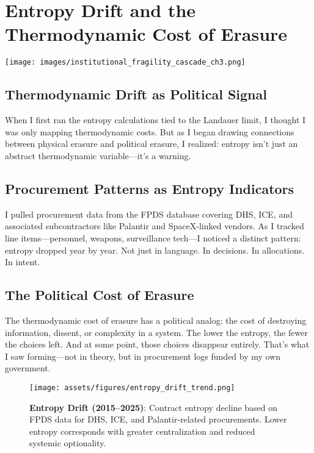 \chapter{Entropy Drift and the Thermodynamic Cost of Erasure}
\label{chap:entropy_drift}
\texttt{[image: images/institutional\_fragility\_cascade\_ch3.png]}

\section{Thermodynamic Drift as Political Signal}
\label{sec:thermo_drift_signal}

When I first ran the entropy calculations tied to the Landauer limit, I thought I was only mapping thermodynamic costs. But as I began drawing connections between physical erasure and political erasure, I realized: entropy isn't just an abstract thermodynamic variable—it’s a warning.

\section{Procurement Patterns as Entropy Indicators}
\label{sec:procurement_entropy}

I pulled procurement data from the FPDS database covering DHS, ICE, and associated subcontractors like Palantir and SpaceX-linked vendors. As I tracked line items—personnel, weapons, surveillance tech—I noticed a distinct pattern: entropy dropped year by year. Not just in language. In decisions. In allocations. In intent.

\section{The Political Cost of Erasure}
\label{sec:political_cost_erasure}

The thermodynamic cost of erasure has a political analog: the cost of destroying information, dissent, or complexity in a system. The lower the entropy, the fewer the choices left. And at some point, those choices disappear entirely. That’s what I saw forming—not in theory, but in procurement logs funded by my own government.

\begin{figure}[H]
  \centering
  \texttt{[image: assets/figures/entropy\_drift\_trend.png]}
  \caption{\textbf{Entropy Drift (2015–2025)}: Contract entropy decline based on FPDS data for DHS, ICE, and Palantir-related procurements. Lower entropy corresponds with greater centralization and reduced systemic optionality.}
  \label{fig:entropy_drift}
\end{figure}

